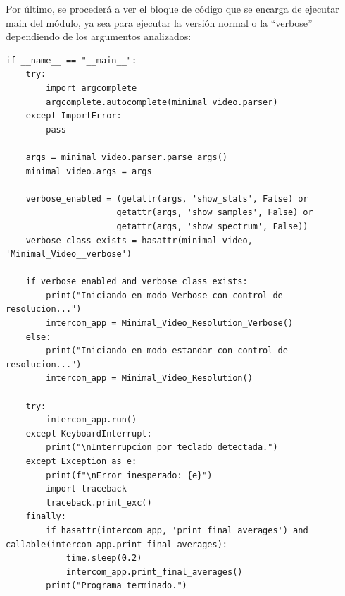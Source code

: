 Por último, se procederá a ver el bloque de código que se encarga de ejecutar main del módulo, ya sea para ejecutar la versión normal o la ``verbose'' dependiendo de los argumentos analizados:
\begin{lstlisting}[style=pythonstyle, caption={Bloque de código del main del módulo \textit{Minimal\_Video\_Resolution.py}.}, label={lst:bloque_codigo_principal}]
if __name__ == "__main__":
    try:
        import argcomplete
        argcomplete.autocomplete(minimal_video.parser)
    except ImportError:
        pass

    args = minimal_video.parser.parse_args()
    minimal_video.args = args

    verbose_enabled = (getattr(args, 'show_stats', False) or
                      getattr(args, 'show_samples', False) or
                      getattr(args, 'show_spectrum', False))
    verbose_class_exists = hasattr(minimal_video, 'Minimal_Video__verbose')

    if verbose_enabled and verbose_class_exists:
        print("Iniciando en modo Verbose con control de resolucion...")
        intercom_app = Minimal_Video_Resolution_Verbose()
    else:
        print("Iniciando en modo estandar con control de resolucion...")
        intercom_app = Minimal_Video_Resolution()

    try:
        intercom_app.run()
    except KeyboardInterrupt:
        print("\nInterrupcion por teclado detectada.")
    except Exception as e:
        print(f"\nError inesperado: {e}")
        import traceback
        traceback.print_exc()
    finally:
        if hasattr(intercom_app, 'print_final_averages') and callable(intercom_app.print_final_averages):
            time.sleep(0.2)
            intercom_app.print_final_averages()
        print("Programa terminado.")
\end{lstlisting}
\vspace{\baselineskip}

